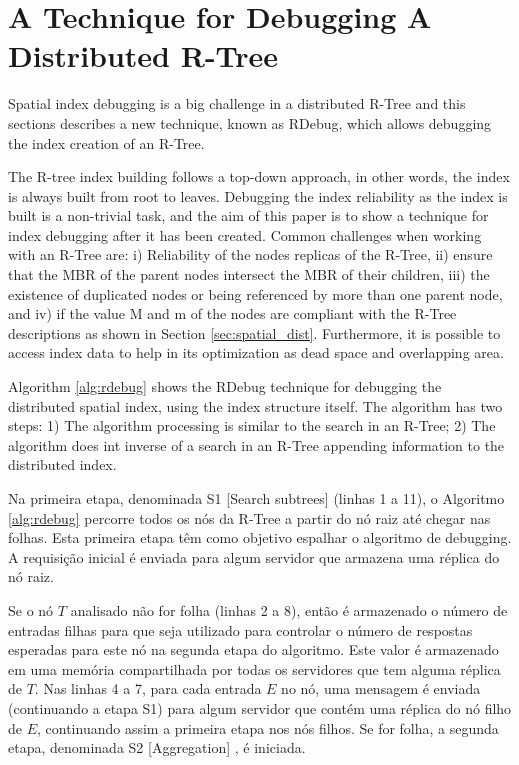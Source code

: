 \section{A Technique for Debugging A Distributed R-Tree}
\label{sec:rdebug}

	Spatial index debugging is a big challenge in a distributed R-Tree and this sections describes a new technique, known as RDebug, which allows debugging the index creation of an R-Tree.
	
	The R-tree index building follows a top-down approach, in other words, the index is always built from root to leaves. Debugging the index reliability as the index is built is a non-trivial task, and the aim of this paper is to show a technique for index debugging after it has been created. Common challenges when working with an R-Tree are: i) Reliability of the nodes replicas of the R-Tree, ii) ensure that the MBR of the parent nodes intersect the MBR of their children, iii) the existence of duplicated nodes or being referenced by more than one parent node, and iv) if the value M and m of the nodes are compliant with the R-Tree descriptions as shown in Section \ref{sec:spatial_dist}. Furthermore, it is possible to access index data to help in its optimization as dead space and overlapping area.

	Algorithm \ref{alg:rdebug} shows the RDebug technique for debugging the distributed spatial index, using the index structure itself. The algorithm has two steps:
1) The algorithm processing is similar to the search in an R-Tree; 2) The algorithm does int inverse of a search in an R-Tree appending information to the distributed index.

Na primeira etapa, denominada S1 [Search subtrees] (linhas 1 a 11), o Algoritmo \ref{alg:rdebug} percorre todos os nós da R-Tree a partir do nó raiz até chegar nas folhas. Esta primeira etapa têm como objetivo espalhar o algoritmo de debugging. A requisição inicial é enviada para algum servidor que armazena uma réplica do nó raiz.  

Se o nó $T$ analisado não for folha (linhas 2 a 8), então é armazenado o número de entradas filhas para que seja utilizado para controlar o número de respostas esperadas para este nó na segunda etapa do algoritmo. Este valor é armazenado em uma memória compartilhada por todas os servidores que tem alguma réplica de $T$. Nas linhas 4 a 7, para cada entrada $E$ no nó, uma mensagem é enviada (continuando a etapa S1) para algum servidor que contém uma réplica do nó filho de $E$, continuando assim a primeira etapa nos nós filhos. Se for folha, a segunda etapa, denominada S2 [Aggregation] , é iniciada. 

